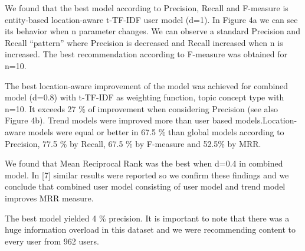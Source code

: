 \documentclass[a4, conference]{IEEEtran}
\begin{document}


We  found  that  the  best  model  according  to  Precision, Recall  and  F-measure  is  entity-based  location-aware  t-TF-IDF  user  model (d=1). In  Figure 4a  we  can  see its behavior when n  parameter  changes.  We  can  observe  a  standard Precision  and  Recall  “pattern”  where  Precision  is  decreased and   Recall   increased   when n   is   increased.   The   best recommendation  according  to  F-measure  was  obtained for n=10.

 The  best  location-aware  improvement  of  the  model  was achieved  for  combined  model  (d=0.8)  with  t-TF-IDF  as weighting function, topic concept type with n=10. It exceeds 27 \%  of  improvement  when  considering  Precision  (see  also Figure  4b).  Trend  models  were  improved  more  than  user based models.Location-aware models were equal or better in 67.5 \% than global models according to Precision, 77.5 \% by Recall, 67.5 \% by F-measure and 52.5\% by MRR. 

We found that Mean Reciprocal Rank was the best when d=0.4   in   combined   model.   In   [7]   similar   results   were reported  so  we  confirm  these  findings  and  we  conclude  that combined  user  model  consisting  of user  model  and  trend model improves MRR measure.

 The  best  model  yielded  4  \%  precision.  It  is  important  to note  that  there  was  a  huge  information  overload  in this dataset  and  we  were  recommending  content  to  every  user from 962 users.
\end{document}
